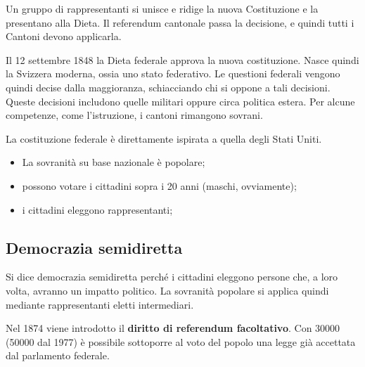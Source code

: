 \documentclass[a4paper]{article}
\begin{document}
Un gruppo di rappresentanti si unisce e ridige la nuova Costituzione e la presentano alla Dieta.
Il referendum cantonale passa la decisione, e quindi tutti i Cantoni devono applicarla.

Il 12 settembre 1848 la Dieta federale approva la nuova costituzione.
Nasce quindi la Svizzera moderna, ossia uno stato federativo.
Le questioni federali vengono quindi decise dalla maggioranza, schiacciando chi si oppone a tali decisioni.
Queste decisioni includono quelle militari oppure circa politica estera.
Per alcune competenze, come l'istruzione, i cantoni rimangono sovrani.

La costituzione federale è direttamente ispirata a quella degli Stati Uniti.
\begin{itemize}
    \item La sovranità su base nazionale è popolare;
    \item possono votare i cittadini sopra i 20 anni (maschi, ovviamente);
    \item i cittadini eleggono rappresentanti;
\end{itemize}


\subsection{Democrazia semidiretta}

Si dice democrazia semidiretta perché i cittadini eleggono persone che, a loro volta,
avranno un impatto politico.
La sovranità popolare si applica quindi mediante rappresentanti eletti intermediari.

Nel 1874 viene introdotto il \textbf{diritto di referendum facoltativo}.
Con 30000 (50000 dal 1977) è possibile sottoporre al voto del popolo una legge già accettata dal parlamento federale.
\end{document}
